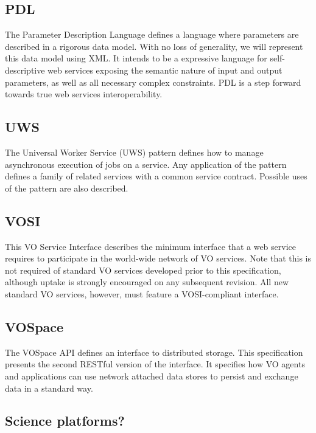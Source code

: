 \documentclass[11pt,a4paper]{ivoa}
\begin{document}
\subsection{PDL}

The Parameter Description Language defines a language where parameters are described in a 
rigorous data model. With no loss of generality, we will represent this data model using 
XML. It intends to be a expressive language for self-descriptive web services exposing 
the semantic nature of input and output parameters, as well as all necessary complex 
constraints. PDL is a step forward towards true web services interoperability. 
 
\subsection{UWS} 

The Universal Worker Service (UWS) pattern defines how to manage asynchronous execution 
of jobs on a service. Any application of the pattern defines a family of related services 
with a common service contract. Possible uses of the pattern are also described. 

\subsection{VOSI} 

This VO Service Interface describes the minimum interface that a web service requires to 
participate in the world-wide network of VO services. Note that this is not required of 
standard VO services developed prior to this specification, although uptake is strongly 
encouraged on any subsequent revision. All new standard VO services, however, must feature 
a VOSI-compliant interface. 

\subsection{VOSpace}

The VOSpace API defines an interface to distributed storage. This specification presents the 
second RESTful version of the interface. It specifies how VO agents and applications can 
use network attached data stores to persist and exchange data in a standard way. 


\subsection{Science platforms?}




\end{document}
